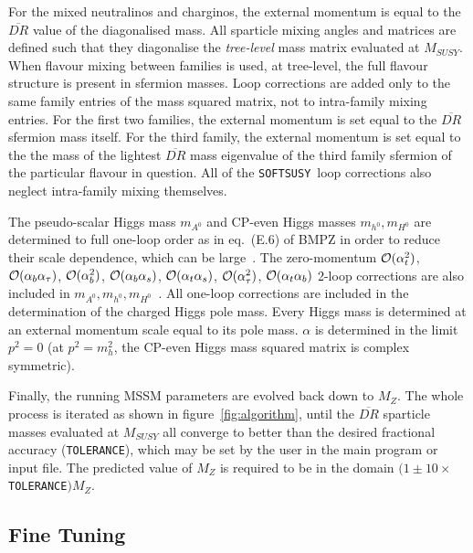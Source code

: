 \documentclass{article}
\def\at{\alpha_t}
\def\ab{\alpha_b}
\def\as{\alpha_s}
\def\atau{\alpha_{\tau}}
\def\oatab{{\cal O}(\at\ab)}
\def\oatas{{\cal O}(\at\as)}
\def\oabas{{\cal O}(\ab\as)}
\def\oatq{{\cal O}(\at^2)}
\def\oabq{{\cal O}(\ab^2)}
\def\oatauq{{\cal O}(\atau^2)}
\def\oabatau{{\cal O}(\ab \atau)}
\def\SOFTSUSY{{\tt SOFTSUSY}}
\def\code#1{\small{\tt #1}\normalsize}
\begin{document}
For the mixed neutralinos and charginos, the
external momentum is equal to the $\overline{DR}$ value of the diagonalised
mass.
All sparticle mixing angles and matrices are defined such that they diagonalise
the {\em tree-level} mass matrix evaluated at $M_{SUSY}$. 
When flavour mixing between families is used, at
tree-level, the full flavour structure is present in sfermion masses.
Loop corrections are added only to the same family entries of the mass squared
matrix, not to
intra-family mixing entries. For the first two families, 
the external momentum is set equal to the $\overline{DR}$ sfermion mass
itself. For the third 
family, the external momentum is set equal to the the mass of the lightest
$\overline{DR}$ mass eigenvalue of the third family sfermion of the particular
flavour in question. 
All of the \SOFTSUSY~loop
corrections also neglect intra-family mixing themselves.

The pseudo-scalar Higgs  mass $m_{A^0}$ and CP-even Higgs masses $m_{h^0},
m_{H^0}$ are determined to full one-loop order
as in eq.~(E.6) of BMPZ in order to reduce
their scale dependence, which can be large~\cite{Katsikatsou:2000cd}. 
The zero-momentum $\oatq$, $\oabatau$, $\oabq$, $\oabas$, $\oatas$, $\oatauq$,
$\oatab$
2-loop corrections are 
also included in $m_{A^0}, m_{h^0},
m_{H^0}$~\cite{Degrassi:2001yf,Brignole:2001jy,Brignole:2002bz,Dedes:2003km}.
All one-loop corrections are included in
the determination of the charged Higgs pole mass.
Every Higgs mass is determined at an external momentum scale equal to its
pole mass. $\alpha$ is determined in the limit $p^2=0$ (at $p^2=m_h^2$, the
CP-even Higgs mass squared matrix is complex symmetric).

Finally, the running MSSM parameters are evolved back down to $M_Z$.
The whole process is iterated as shown in figure~\ref{fig:algorithm}, until the
$\overline{DR}$ sparticle masses evaluated at $M_{SUSY}$
all converge to better than the desired fractional accuracy
(\code{TOLERANCE}), which may be set by the user in the main program or input
file. The predicted value of $M_Z$ is required to be in the domain
$(1\pm10\times$\code{TOLERANCE}$)M_Z$.

\subsection{Fine Tuning \label{sec:finetune}}
\end{document}
